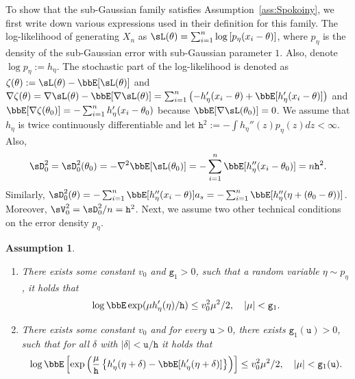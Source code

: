 \documentclass[11pt]{article}
\newtheorem{assumption}{Assumption}[section]
\begin{document}
To show that the sub-Gaussian family satisfies Assumption~\ref{ass:Spokoiny}, we first write down various expressions used in their definition for this family.
The log-likelihood of generating $X_n$ as $\sL(\theta) = \sum_{i=1}^{n}\log  \left[p_{\eta}(x_i-\theta)\right] $, where $p_{\eta}$ is the density of the sub-Gaussian error with sub-Gaussian parameter $1$. Also, denote $\log p_{\eta} := h_{\eta}$.
The stochastic part of the log-likelihood is denoted as $\zeta (\theta):= \sL(\theta) - \bbE[\sL(\theta)]$ and $\nabla \zeta (\theta) = \nabla \sL(\theta) - \bbE[\nabla \sL(\theta)]= \sum_{i=1}^{n} \left(-h_{\eta}'(x_i-\theta) +\bbE[ h_{\eta}'(x_i-\theta)] \right)$ and $\bbE[\nabla \zeta(\theta_0)]=- \sum_{i=1}^{n} h_{\eta}'(x_i-\theta_0)$ because $\bbE[\nabla \sL(\theta_0)]=0$. 
We assume that $h_\eta$ is twice continuously differentiable and let
$\mathtt{h}^2:= -\int h_\eta''(z)p_{\eta}(z)dz <\infty$.
Also, 
\begin{align}
\sD_0^2 = \sD_0^{2}(\theta_0)
     = 
    - \nabla^{2} \bbE[ \sL(\theta_0)] = -\sum_{i=1}^{n} \bbE[h_{\eta}''(x_i-\theta_0)]  = n\mathtt{h}^2.
    \end{align}
Similarly, $\sD_0^{2}(\theta) = -\sum_{i=1}^{n} \bbE[h_{\eta}''(x_i-\theta)]a_s  = -\sum_{i=1}^{n} \bbE[h_{\eta}''(\eta + (\theta_0-\theta))]  $. Moreover, $\sV_0^2=\sD_0^2/n= \mathtt{h}^2$.
Next, we assume two other technical conditions on the error density $p_{\eta}$.
\begin{assumption}~\label{ass:AddSG}
\begin{enumerate}
    \item There exists some constant $v_0$ and $\mathtt{g}_1>0$, such that a random variable $\eta \sim p_\eta$, it holds that
    \begin{align}
        \log \bbE \exp(\mu h'_{\eta}(\eta)/ \mathtt{h}) \leq v_0^2\mu^2/2, \quad  |\mu|<\mathtt{g}_1.
    \end{align}
    \item There exists some constant $v_0$ and for every $\mathtt{u}>0$, there exists $\mathtt{g}_1(\mathtt{u})>0$, such that for all $\delta$ with $|\delta|<\mathtt{u}/\mathtt{h}$ it holds that
    \begin{align}
        \log \bbE \left[\exp
    \left(\frac{\mu}{\mathtt{h}} \left\{h'_{\eta}(\eta+\delta) -\bbE[h'_{\eta}(\eta+\delta)] \right\}\right) \right] \leq v_0^2\mu^2/2, \quad  |\mu|<\mathtt{g}_1(\mathtt{u}).
    \end{align}
\end{enumerate}   
\end{assumption}
\end{document}
